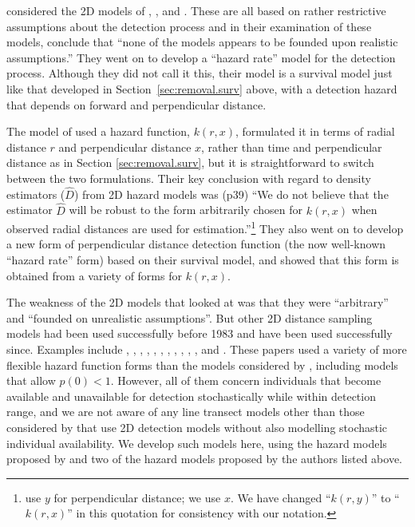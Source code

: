 \documentclass[useAMS,usenatbib,referee]{biom}
\begin{document}
\citet{Hayes+Buckland:83} considered the 2D models of \cite{Hayne:49}, \cite{Eberhardt:78}, \cite{Burnham+Anderson:76} and \cite{Burnham:79}. These are all based on rather restrictive assumptions about the detection process and in their examination of these models, \citet[][p 33]{Hayes+Buckland:83} conclude that ``none of the models appears to be founded upon realistic assumptions.'' They went on to develop a ``hazard rate'' model for the detection process. Although they did not call it this, their model is a survival model just like that developed in Section~\ref{sec:removal.surv} above, with a detection hazard that depends on forward and perpendicular distance.

The model of \cite{Hayes+Buckland:83} used a hazard function, $k(r,x)$, formulated it in terms of radial distance $r$ and perpendicular distance $x$, rather than time and perpendicular distance as in Section \ref{sec:removal.surv}, but it is straightforward to switch between the two formulations. Their key conclusion with regard to density estimators ($\hat{D}$) from 2D hazard models was (p39) ``We do not believe that the estimator $\hat{D}$ will be robust to the form arbitrarily chosen for $k(r,x)$ when observed radial distances are used for estimation.''\footnote{\cite{Hayes+Buckland:83} use $y$ for perpendicular distance; we use $x$. We have changed ``$k(r,y)$'' to ``$k(r,x)$'' in this quotation for consistency with our notation.} They also went on to develop a new form of perpendicular distance detection function (the now well-known ``hazard rate'' form) based on their survival model, and showed that this form is obtained from a variety of forms for $k(r,x)$. 

The weakness of the 2D models that \cite{Hayes+Buckland:83} looked at was that they were ``arbitrary'' and ``founded on unrealistic assumptions''. But other 2D distance sampling models had been used successfully before 1983 \citep[][for example]{Schweder:74} and have been used successfully since. Examples include \citep{Schweder:90}, \cite{Schweder+al:96}, \cite{Schweder+al:97}, \cite{Schweder+al:99}, \cite{Skaug+Schweder:99}, \cite{Okamura:03}, \cite{Skaug+al:04}, \cite{Okamura+al:03}, \cite{Okamura+al:06}, \cite{Okamura+al:12}, \cite{Borchers+al:13}, \cite{Langrock+al:13} and  \cite{Borchers+Langrock:ip}. These papers used a variety of more flexible hazard function forms than the models considered by \cite{Hayes+Buckland:83}, including models that allow $p(0)<1$. However, all of them concern individuals that become available and unavailable for detection stochastically while within detection range, and we are not aware of any line transect models other than those considered by \cite{Hayes+Buckland:83} that use 2D detection models without also modelling stochastic individual availability. We develop such models here, using the hazard models proposed by \cite{Hayes+Buckland:83} and two of the hazard models proposed by the authors listed above. 
\end{document}
